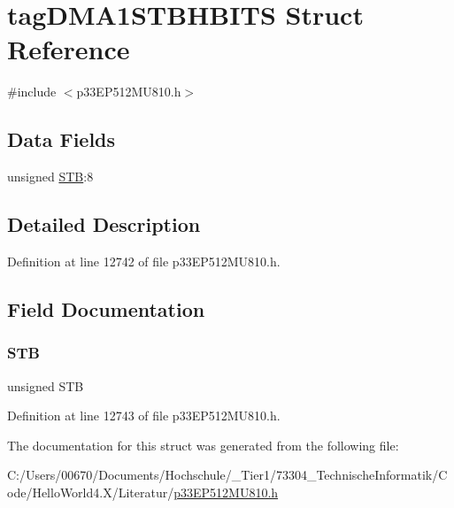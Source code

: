 \hypertarget{structtag_d_m_a1_s_t_b_h_b_i_t_s}{}\section{tag\+D\+M\+A1\+S\+T\+B\+H\+B\+I\+TS Struct Reference}
\label{structtag_d_m_a1_s_t_b_h_b_i_t_s}


{\ttfamily \#include $<$p33\+E\+P512\+M\+U810.\+h$>$}

\subsection*{Data Fields}
\begin{DoxyCompactItemize}
\item 
unsigned \hyperlink{structtag_d_m_a1_s_t_b_h_b_i_t_s_a9bd043a4db27e09b5035a563a8758fe7}{S\+TB}\+:8
\end{DoxyCompactItemize}


\subsection{Detailed Description}


Definition at line 12742 of file p33\+E\+P512\+M\+U810.\+h.



\subsection{Field Documentation}
\mbox{\label{structtag_d_m_a1_s_t_b_h_b_i_t_s_a9bd043a4db27e09b5035a563a8758fe7}} 
\subsubsection{\texorpdfstring{S\+TB}{STB}}
{\footnotesize\ttfamily unsigned S\+TB}



Definition at line 12743 of file p33\+E\+P512\+M\+U810.\+h.



The documentation for this struct was generated from the following file\+:\begin{DoxyCompactItemize}
\item 
C\+:/\+Users/00670/\+Documents/\+Hochschule/\+\_\+\+Tier1/73304\+\_\+\+Technische\+Informatik/\+Code/\+Hello\+World4.\+X/\+Literatur/\hyperlink{p33_e_p512_m_u810_8h}{p33\+E\+P512\+M\+U810.\+h}\end{DoxyCompactItemize}

